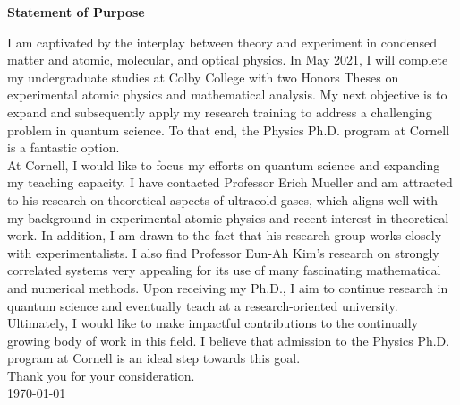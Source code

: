 \documentclass[12pt]{article}
\begin{document}
\begin{center}
	\textbf{Statement of Purpose}
\end{center}
I am captivated by the interplay between theory and experiment in condensed matter and atomic, molecular, and optical physics. In May 2021, I will complete my undergraduate studies at Colby College with two Honors Theses on experimental atomic physics and mathematical analysis. My next objective is to expand and subsequently apply my research training to address a challenging problem in quantum science. To that end, the Physics Ph.D. program at Cornell is a fantastic option.  \\ 





At Cornell, I would like to focus my efforts on quantum science and expanding my teaching capacity. I have contacted Professor Erich Mueller and am attracted to his research on theoretical aspects of ultracold gases, which aligns well with my background in experimental atomic physics and recent interest in theoretical work. In addition, I am drawn to the fact that his research group works closely with experimentalists. I also find Professor Eun-Ah Kim's research on strongly correlated systems very appealing for its use of many fascinating mathematical and numerical methods. Upon receiving my Ph.D., I aim to continue research in quantum science and eventually teach at a research-oriented university. Ultimately, I would like to make impactful contributions to the continually growing body of work in this field. I believe that admission to the Physics Ph.D. program at Cornell is an ideal step towards this goal. \\

\noindent Thank you for your consideration. \\

\noindent \today\\

	











	
	
	
	
	
\end{document}
